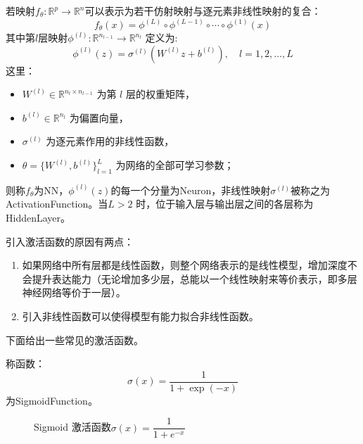 \begin{definition}
	若映射$f_\theta:\mathbb{R}^p\rightarrow\mathbb{R}^n$可以表示为若干仿射映射与逐元素非线性映射的复合：
	\begin{equation*}
		f_\theta(x)=\phi^{(L)}\!\circ \phi^{(L-1)} \circ \cdots \circ \phi^{(1)}(x)
	\end{equation*}
	其中第$l$层映射$\phi^{(l)}:\mathbb{R}^{n_{l-1}}\to\mathbb{R}^{n_l}$ 定义为:
	\begin{equation*}
		\phi^{(l)}(z)=\sigma^{(l)}\!\left(W^{(l)}z+b^{(l)}\right),\quad l=1,2,\dots,L
	\end{equation*}
	这里：
	\begin{itemize}
		\item $W^{(l)}\in\mathbb{R}^{n_l\times n_{l-1}}$ 为第 $l$ 层的权重矩阵，
		\item $b^{(l)}\in\mathbb{R}^{n_l}$ 为偏置向量，
		\item $\sigma^{(l)}$ 为逐元素作用的非线性函数，
		\item $\theta=\{W^{(l)},b^{(l)}\}_{l=1}^L$ 为网络的全部可学习参数；
	\end{itemize}
	则称$f_\theta$为\gls{NN}，$\phi^{(l)}(z)$的每一个分量为\gls{Neuron}，非线性映射$\sigma^{(l)}$被称之为\gls{ActivationFunction}。当$L>2$ 时，位于输入层与输出层之间的各层称为\gls{HiddenLayer}。
\end{definition}
\begin{note}
	引入激活函数的原因有两点：
	\begin{enumerate}
		\item 如果网络中所有层都是线性函数，则整个网络表示的是线性模型，增加深度不会提升表达能力（无论增加多少层，总能以一个线性映射来等价表示，即多层神经网络等价于一层）。
		\item 引入非线性函数可以使得模型有能力拟合非线性函数。
	\end{enumerate}
\end{note}
下面给出一些常见的激活函数。
\begin{definition}
	称函数：
	\begin{equation*}
		\sigma(x) = \frac{1}{1+\exp(-x)}
	\end{equation*}
	为\gls{SigmoidFunction}。
\end{definition}
\begin{figure}[H]
	\centering
	\caption{Sigmoid 激活函数$\sigma(x)=\dfrac{1}{1+e^{-x}}$}
\end{figure}
